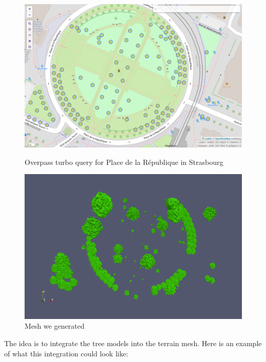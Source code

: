 \documentclass[12pt]{article}
\begin{document}
\begin{figure}[H]
    \begin{minipage}{0.45\textwidth}
        \centering
        \includegraphics[width=\textwidth]{images/ovt-republic.png}
        \caption{Overpass turbo query for Place de la République in Strasbourg}
    \end{minipage}
    \begin{minipage}{0.45\textwidth}
        \centering
        \includegraphics[width=\textwidth]{images/mesh-republic-lod3.png}
        \caption{Mesh we generated}
    \end{minipage}
\end{figure}

The idea is to integrate the tree models into the terrain mesh.
Here is an example of what this integration could look like:
\end{document}
